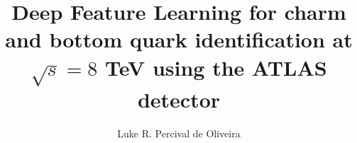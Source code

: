 \title{Deep Feature Learning for charm and bottom quark identification at $\sqrt{s} = 8$ TeV using the ATLAS detector}
\author{Luke R. Percival de Oliveira}




